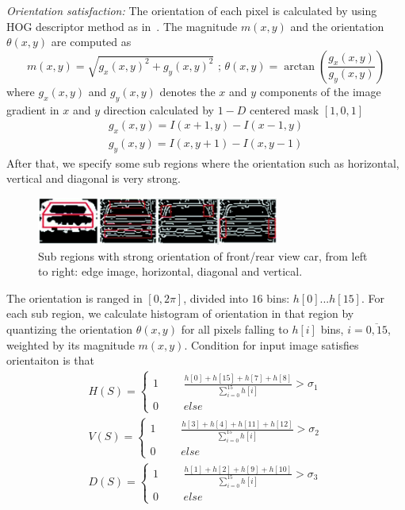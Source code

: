 \textit{Orientation satisfaction:}
The orientation of each pixel is calculated by using HOG descriptor method as in~\cite{bay2008surf}. The magnitude $m(x, y)$
and the orientation $\theta(x, y)$ are computed as
\begin{equation}
    m(x,y) = \sqrt{{g_x(x,y)}^2 + {g_y(x,y)}^2}
    \mbox{~;~}
    \theta(x,y) = \arctan(\frac{g_x(x,y)}{g_y(x,y)})
\end{equation}
where $g_x(x, y)$ and $g_y(x, y)$ denotes the $x$ and $y$ components of the
image gradient in $x$ and $y$ direction calculated by $1-D$ centered mask $[ 1, 0, 1]$
\begin{equation}
    \begin{array}{rcl}
    g_x(x,y) = I(x+1,y) - I(x-1,y) \\
    g_y(x,y) = I(x,y+1) - I(x,y-1)
    \end{array}
\end{equation}
After that, we specify some sub regions where the
orientation such as horizontal, vertical and diagonal is very strong.
\begin{figure}[ht]
  \centering
  \includegraphics[width=3.15in]{images/hog.jpg}
  \caption{Sub regions with strong orientation of front/rear view car, from left to
right: edge image, horizontal, diagonal and vertical.}
  \label{fig:hog}
\end{figure}
The orientation is ranged in $[0, 2\pi]$, divided into $16$ bins: $h[0]...
h[15]$. For each sub region, we calculate histogram of orientation in
that region by quantizing the orientation $\theta(x, y)$ for all pixels falling
to $h[i]$ bins, $i=\overline{0,15}$, weighted by its magnitude $m(x, y)$.
Condition for input image satisfies orientaiton is that
\begin{equation}
    \begin{array}{rcl}
   H(S) = \left\{ 
   \begin{array}{rcl}
   1 & \mbox{~~} & \frac{h[0] + h[15] + h[7] + h[8]}{\sum_{i=0}^{15}h[i]} > \sigma_1\\
   0 & \mbox{~~} & else
   \end{array}\right. \\
   V(S) = \left\{ 
   \begin{array}{rcl}
   1 & \mbox{~~} & \frac{h[3] + h[4] + h[11] + h[12]}{\sum_{i=0}^{15}h[i]} > \sigma_2\\
   0 & \mbox{~~} & else
   \end{array}\right. \\
   D(S) = \left\{ 
   \begin{array}{rcl}
   1 & \mbox{~~} & \frac{h[1] + h[2] + h[9] + h[10]}{\sum_{i=0}^{15}h[i]} > \sigma_3\\
   0 & \mbox{~~} & else
   \end{array}\right. 
    \end{array}
\end{equation}

